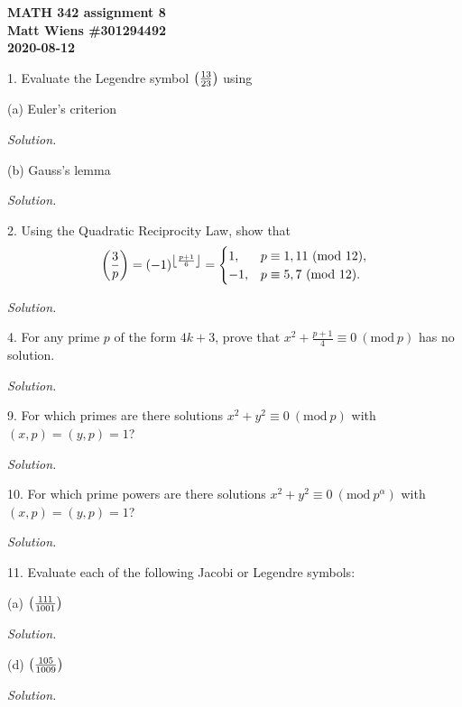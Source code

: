 \documentclass{article}
\newcommand{\Mod}[1]{\ (\mathrm{mod}\ #1)}
\newcommand{\Leg}[2]{\del{\frac{#1}{#2}}}
\DeclarePairedDelimiter\floor{\lfloor}{\rfloor}
\begin{document}
\textbf{MATH 342 assignment 8} \\
\textbf{Matt Wiens \#301294492} \\
\textbf{2020-08-12}

1. Evaluate the Legendre symbol $\Leg{13}{23}$ using

(a) Euler's criterion

\textit{Solution.}

\vspace{5mm}

(b) Gauss's lemma

\textit{Solution.}

\newpage

2. Using the Quadratic Reciprocity Law, show that
%
\begin{equation*}
    \Leg{3}{p}
    = (-1)^{\floor*{\frac{p + 1}{6}}}
    =
    \begin{cases}
        1, & p \equiv 1, 11 \Mod{12}, \\
        -1, & p \equiv 5, 7 \Mod{12}.
    \end{cases}
\end{equation*}

\textit{Solution.}

\newpage

4. For any prime $p$ of the form $4 k + 3$, prove that
$x^2 + \frac{p + 1}{4} \equiv 0 \Mod{p}$ has no solution.

\textit{Solution.}

\newpage

9. For which primes are there solutions $x^2 + y^2 \equiv 0 \Mod{p}$
with $(x, p) = (y, p) = 1$?

\textit{Solution.}

\newpage

10. For which prime powers are there solutions $x^2 + y^2 \equiv 0 \Mod{p^\alpha}$
with $(x, p) = (y, p) = 1$?

\textit{Solution.}

\newpage

11. Evaluate each of the following Jacobi or Legendre symbols:

(a) $\Leg{111}{1001}$

\textit{Solution.}

\vspace{5mm}

(d) $\Leg{105}{1009}$

\textit{Solution.}
\end{document}
